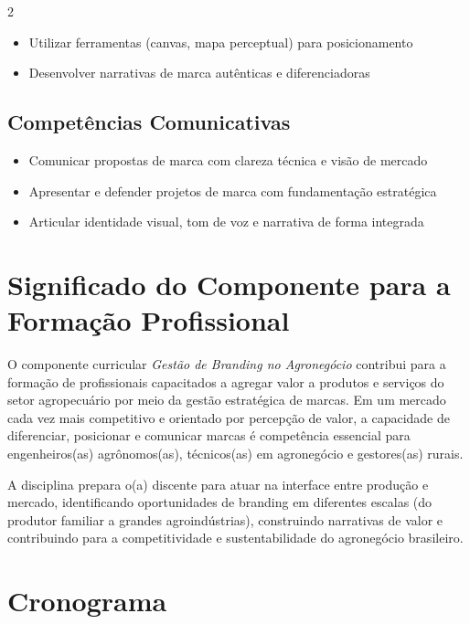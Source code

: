 \documentclass[11pt,a4paper]{article}
\begin{document}
\begin{multicols}{2}
\begin{itemize}
\item Utilizar ferramentas (canvas, mapa perceptual) para posicionamento

\item Desenvolver narrativas de marca autênticas e diferenciadoras

\end{itemize}

\subsection*{Competências Comunicativas}

\begin{itemize}

\item Comunicar propostas de marca com clareza técnica e visão de mercado

\item Apresentar e defender projetos de marca com fundamentação estratégica

\item Articular identidade visual, tom de voz e narrativa de forma integrada

\end{itemize}

\end{multicols}

\section*{Significado do Componente para a Formação Profissional}

O componente curricular \textit{Gestão de Branding no Agronegócio} contribui para a formação de profissionais capacitados a agregar valor a produtos e serviços do setor agropecuário por meio da gestão estratégica de marcas. Em um mercado cada vez mais competitivo e orientado por percepção de valor, a capacidade de diferenciar, posicionar e comunicar marcas é competência essencial para engenheiros(as) agrônomos(as), técnicos(as) em agronegócio e gestores(as) rurais.

A disciplina prepara o(a) discente para atuar na interface entre produção e mercado, identificando oportunidades de branding em diferentes escalas (do produtor familiar a grandes agroindústrias), construindo narrativas de valor e contribuindo para a competitividade e sustentabilidade do agronegócio brasileiro.

\section*{Cronograma}
\end{document}
